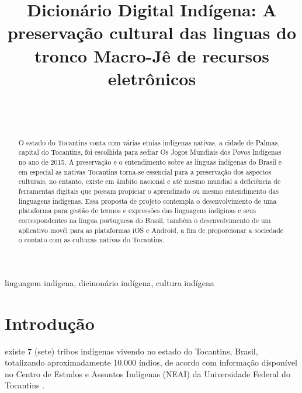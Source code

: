 \documentclass[journal]{IEEEtran}
\begin{document}
\title{Dicionário Digital Indígena: A preservação cultural das linguas do tronco Macro-Jê de recursos eletrônicos}
\author{
	\\
	\\
}


\maketitle

\begin{abstract}

O estado do Tocantins conta com várias etnias indígenas nativas, a cidade de Palmas, capital do Tocantins, foi escolhida para sediar Os Jogos Mundiais dos Povos Indígenas no ano de 2015. A preservação e o entendimento sobre as línguas indígenas do Brasil e em especial as nativas Tocantins torna-se essencial para a preservação dos aspectos culturais, no entanto, existe em âmbito nacional e até mesmo mundial a deficiência de ferramentas digitais que possam propiciar o aprendizado ou mesmo entendimento das linguagens indígenas. Essa proposta de projeto contempla o desenvolvimento de uma plataforma para gestão de termos e expressões das linguagens indíginas e seus correspondentes na lingua portuguesa do Brasil, também o desenvolvimento de um aplicativo movél para as plataformas iOS e Android, a fim de proporcionar a sociedade o contato com as culturas nativas do Tocantins.

\end{abstract}

\begin{IEEEkeywords}
linguagem indígena, dicinonário indígena, cultura indígena
\end{IEEEkeywords}

\section{Introdução}

 existe 7 (sete) tribos indígenas vivendo no estado do Tocantins, Brasil, totalizando aproximadamente 10.000 índios, de acordo com informação disponível no Centro de Estudos e Assuntos Indígenas (NEAI) da Universidade Federal do Tocantins \cite{demobile}.
\end{document}
